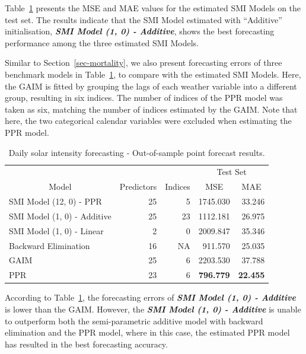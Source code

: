 \documentclass[11pt,a4paper,]{article}
\begin{document}
Table~\ref{tbl-solar} presents the MSE and MAE values for the estimated
SMI Models on the test set. The results indicate that the SMI Model
estimated with ``Additive'' initialisation, \textbf{\emph{SMI Model (1,
0) - Additive}}, shows the best forecasting performance among the three
estimated SMI Models.

Similar to Section~\ref{sec-mortality}, we also present forecasting
errors of three benchmark models in Table~\ref{tbl-solar}, to compare
with the estimated SMI Models. Here, the GAIM is fitted by grouping the
lags of each weather variable into a different group, resulting in six
indices. The number of indices of the PPR model was taken as six,
matching the number of indices estimated by the GAIM. Note that here,
the two categorical calendar variables were excluded when estimating the
PPR model.

\hypertarget{tbl-solar}{}
\begin{table}[!h]
\caption{\label{tbl-solar}Daily solar intensity forecasting - Out-of-sample point forecast
results. }\tabularnewline

\centering
\begin{tabular}{lrr>{}r>{}r}
\toprule
\multicolumn{1}{c}{} & \multicolumn{1}{c}{} & \multicolumn{1}{c}{} & \multicolumn{2}{c}{Test Set} \\
\cmidrule(l{3pt}r{3pt}){4-5}
\multicolumn{1}{c}{Model} & \multicolumn{1}{c}{Predictors} & \multicolumn{1}{c}{Indices} & \multicolumn{1}{c}{MSE} & \multicolumn{1}{c}{MAE}\\
\midrule
SMI Model (12, 0) - PPR & 25 & 5 & 1745.030 & 33.246\\
SMI Model (1, 0) - Additive & 25 & 23 & 1112.181 & 26.975\\
SMI Model (1, 0) - Linear & 2 & 0 & 2009.847 & 35.346\\
Backward Elimination & 16 & NA & 911.570 & 25.035\\
GAIM & 25 & 6 & 2203.530 & 37.788\\
\addlinespace
PPR & 23 & 6 & \textbf{796.779} & \textbf{22.455}\\
\bottomrule
\end{tabular}
\end{table}

According to Table~\ref{tbl-solar}, the forecasting errors of
\textbf{\emph{SMI Model (1, 0) - Additive}} is lower than the GAIM.
However, the \textbf{\emph{SMI Model (1, 0) - Additive}} is unable to
outperform both the semi-parametric additive model with backward
elimination and the PPR model, where in this case, the estimated PPR
model has resulted in the best forecasting accuracy.
\end{document}
